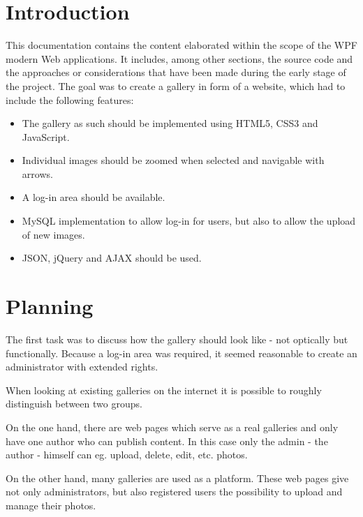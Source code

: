 \documentclass[a4paper,12pt,oneside]{article} %
\begin{document}
 \newpage %





\newpage

\section{Introduction}

This documentation contains the content elaborated within the scope
of the WPF modern Web applications. It includes, among other sections,
the source code and the approaches or considerations that have been
made during the early stage of the project.
The goal was to create a gallery in form of a website, which had
to include the following features:
\begin{itemize}
\item The gallery as such should be implemented using HTML5, CSS3 and JavaScript.
\item Individual images should be zoomed when selected and navigable with arrows.
\item A log-in area should be available.
\item MySQL implementation to allow log-in for users, but also to allow the upload of new images.
\item JSON, jQuery and AJAX should be used.
\end{itemize}

\newpage

\section{Planning}

The first task was to discuss how the gallery should look like
- not optically but functionally. Because a log-in area was required,
it seemed reasonable to create an administrator with extended
rights.

When looking at existing galleries on the internet it is possible to
roughly distinguish between two groups.

On the one hand, there are web pages which serve as a real galleries and
only have one author who can publish content. In this case only the admin
- the author - himself can eg. upload, delete, edit, etc. photos.

On the other hand, many galleries are used as a platform.
These web pages give not only administrators, but also registered users
the possibility to upload and manage their photos.
\end{document}

